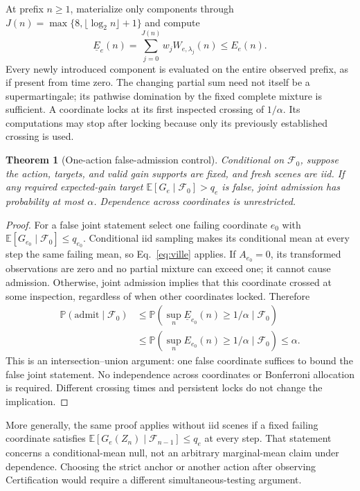 \documentclass[11pt]{article}
\newtheorem{theorem}{Theorem}
\newcommand{\E}{\mathbb E}
\newcommand{\Prb}{\mathbb P}
\newcommand{\F}{\mathcal F}
\begin{document}
At prefix $n\ge1$, materialize only components through $J(n)=\max\{8,\lfloor\log_2n\rfloor+1\}$ and compute
\begin{equation}
 \underline E_e(n)=\sum_{j=0}^{J(n)}w_jW_{e,\lambda_j}(n)\le E_e(n).
\end{equation}
Every newly introduced component is evaluated on the entire observed prefix, as if present from time zero. The changing partial sum need not itself be a supermartingale; its pathwise domination by the fixed complete mixture is sufficient. A coordinate locks at its first inspected crossing of $1/\alpha$. Its computations may stop after locking because only its previously established crossing is used.

\begin{theorem}[One-action false-admission control]
Conditional on $\F_0$, suppose the action, targets, and valid gain supports are fixed, and fresh scenes are iid. If any required expected-gain target $\E[G_e\mid\F_0]>q_e$ is false, joint admission has probability at most $\alpha$. Dependence across coordinates is unrestricted.
\end{theorem}
\begin{proof}
For a false joint statement select one failing coordinate $e_0$ with $\E[G_{e_0}\mid\F_0]\le q_{e_0}$. Conditional iid sampling makes its conditional mean at every step the same failing mean, so Eq.~\eqref{eq:ville} applies. If $A_{e_0}=0$, its transformed observations are zero and no partial mixture can exceed one; it cannot cause admission. Otherwise, joint admission implies that this coordinate crossed at some inspection, regardless of when other coordinates locked. Therefore
\begin{align}
 \Prb(\mathrm{admit}\mid\F_0)
 &\le\Prb\!\left(\sup_n\underline E_{e_0}(n)\ge1/\alpha\mid\F_0\right)\\
 &\le\Prb\!\left(\sup_nE_{e_0}(n)\ge1/\alpha\mid\F_0\right)\le\alpha.
\end{align}
This is an intersection--union argument: one false coordinate suffices to bound the false joint statement. No independence across coordinates or Bonferroni allocation is required. Different crossing times and persistent locks do not change the implication.
\end{proof}

More generally, the same proof applies without iid scenes if a fixed failing coordinate satisfies $\E[G_e(Z_n)\mid\F_{n-1}]\le q_e$ at every step. That statement concerns a conditional-mean null, not an arbitrary marginal-mean claim under dependence. Choosing the strict anchor or another action after observing Certification would require a different simultaneous-testing argument.
\end{document}
